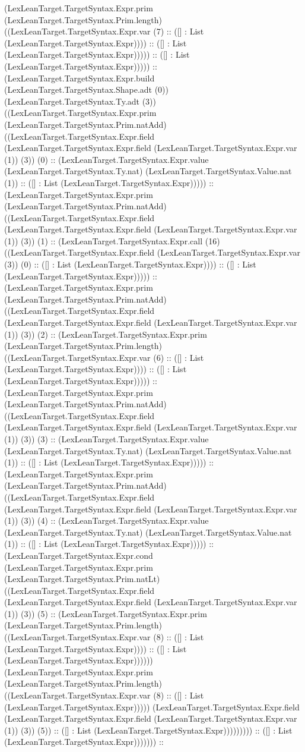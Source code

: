 \documentclass[11pt]{article}
\begin{document}
(LexLeanTarget.TargetSyntax.Expr.prim (LexLeanTarget.TargetSyntax.Prim.length) ((LexLeanTarget.TargetSyntax.Expr.var (7) :: ([] : List (LexLeanTarget.TargetSyntax.Expr)))) :: ([] : List (LexLeanTarget.TargetSyntax.Expr))))) :: ([] : List (LexLeanTarget.TargetSyntax.Expr))))) :: (LexLeanTarget.TargetSyntax.Expr.build (LexLeanTarget.TargetSyntax.Shape.adt (0)) (LexLeanTarget.TargetSyntax.Ty.adt (3)) ((LexLeanTarget.TargetSyntax.Expr.prim (LexLeanTarget.TargetSyntax.Prim.natAdd) ((LexLeanTarget.TargetSyntax.Expr.field (LexLeanTarget.TargetSyntax.Expr.field (LexLeanTarget.TargetSyntax.Expr.var (1)) (3)) (0) :: (LexLeanTarget.TargetSyntax.Expr.value (LexLeanTarget.TargetSyntax.Ty.nat) (LexLeanTarget.TargetSyntax.Value.nat (1)) :: ([] : List (LexLeanTarget.TargetSyntax.Expr))))) :: (LexLeanTarget.TargetSyntax.Expr.prim (LexLeanTarget.TargetSyntax.Prim.natAdd) ((LexLeanTarget.TargetSyntax.Expr.field (LexLeanTarget.TargetSyntax.Expr.field (LexLeanTarget.TargetSyntax.Expr.var (1)) (3)) (1) :: (LexLeanTarget.TargetSyntax.Expr.call (16) ((LexLeanTarget.TargetSyntax.Expr.field (LexLeanTarget.TargetSyntax.Expr.var (3)) (0) :: ([] : List (LexLeanTarget.TargetSyntax.Expr)))) :: ([] : List (LexLeanTarget.TargetSyntax.Expr))))) :: (LexLeanTarget.TargetSyntax.Expr.prim (LexLeanTarget.TargetSyntax.Prim.natAdd) ((LexLeanTarget.TargetSyntax.Expr.field (LexLeanTarget.TargetSyntax.Expr.field (LexLeanTarget.TargetSyntax.Expr.var (1)) (3)) (2) :: (LexLeanTarget.TargetSyntax.Expr.prim (LexLeanTarget.TargetSyntax.Prim.length) ((LexLeanTarget.TargetSyntax.Expr.var (6) :: ([] : List (LexLeanTarget.TargetSyntax.Expr)))) :: ([] : List (LexLeanTarget.TargetSyntax.Expr))))) :: (LexLeanTarget.TargetSyntax.Expr.prim (LexLeanTarget.TargetSyntax.Prim.natAdd) ((LexLeanTarget.TargetSyntax.Expr.field (LexLeanTarget.TargetSyntax.Expr.field (LexLeanTarget.TargetSyntax.Expr.var (1)) (3)) (3) :: (LexLeanTarget.TargetSyntax.Expr.value (LexLeanTarget.TargetSyntax.Ty.nat) (LexLeanTarget.TargetSyntax.Value.nat (1)) :: ([] : List (LexLeanTarget.TargetSyntax.Expr))))) :: (LexLeanTarget.TargetSyntax.Expr.prim (LexLeanTarget.TargetSyntax.Prim.natAdd) ((LexLeanTarget.TargetSyntax.Expr.field (LexLeanTarget.TargetSyntax.Expr.field (LexLeanTarget.TargetSyntax.Expr.var (1)) (3)) (4) :: (LexLeanTarget.TargetSyntax.Expr.value (LexLeanTarget.TargetSyntax.Ty.nat) (LexLeanTarget.TargetSyntax.Value.nat (1)) :: ([] : List (LexLeanTarget.TargetSyntax.Expr))))) :: (LexLeanTarget.TargetSyntax.Expr.cond (LexLeanTarget.TargetSyntax.Expr.prim (LexLeanTarget.TargetSyntax.Prim.natLt) ((LexLeanTarget.TargetSyntax.Expr.field (LexLeanTarget.TargetSyntax.Expr.field (LexLeanTarget.TargetSyntax.Expr.var (1)) (3)) (5) :: (LexLeanTarget.TargetSyntax.Expr.prim (LexLeanTarget.TargetSyntax.Prim.length) ((LexLeanTarget.TargetSyntax.Expr.var (8) :: ([] : List (LexLeanTarget.TargetSyntax.Expr)))) :: ([] : List (LexLeanTarget.TargetSyntax.Expr)))))) (LexLeanTarget.TargetSyntax.Expr.prim (LexLeanTarget.TargetSyntax.Prim.length) ((LexLeanTarget.TargetSyntax.Expr.var (8) :: ([] : List (LexLeanTarget.TargetSyntax.Expr))))) (LexLeanTarget.TargetSyntax.Expr.field (LexLeanTarget.TargetSyntax.Expr.field (LexLeanTarget.TargetSyntax.Expr.var (1)) (3)) (5)) :: ([] : List (LexLeanTarget.TargetSyntax.Expr))))))))) :: ([] : List (LexLeanTarget.TargetSyntax.Expr))))))) :: 
\end{document}
